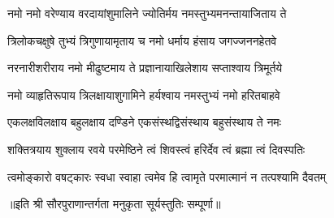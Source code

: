

\twolineshloka
{नमो नमो वरेण्याय वरदायांशुमालिने}
{ज्योतिर्मय नमस्तुभ्यमनन्तायाजिताय ते}

\twolineshloka
{त्रिलोकचक्षुषे तुभ्यं त्रिगुणायामृताय च}
{नमो धर्माय हंसाय जगज्जननहेतवे}

\twolineshloka
{नरनारीशरीराय नमो मीढुष्टमाय ते}
{प्रज्ञानायाखिलेशाय सप्ताश्वाय त्रिमूर्तये}

\twolineshloka
{नमो व्याहृतिरूपाय त्रिलक्षायाशुगामिने}
{हर्यश्वाय नमस्तुभ्यं नमो हरितबाहवे}

\twolineshloka
{एकलक्षविलक्षाय बहुलक्षाय दण्डिने}
{एकसंस्थद्विसंस्थाय बहुसंस्थाय ते नमः}

\twolineshloka
{शक्तित्रयाय शुक्लाय रवये परमेष्ठिने}
{त्वं शिवस्त्वं हरिर्देव त्वं ब्रह्मा त्वं दिवस्पतिः}

\twolineshloka
{त्वमोङ्कारो वषट्कारः स्वधा स्वाहा त्वमेव हि}
{त्वामृते परमात्मानं न तत्पश्यामि दैवतम्}


॥इति श्री सौरपुराणान्तर्गता मनुकृता सूर्यस्तुतिः सम्पूर्णा॥